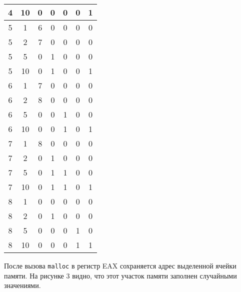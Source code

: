 \begin{table}[]
\begin{tabular}{|c|c|c|c|c|c|c|}
4     & 10     & 0         & 0        & 0        & 0          & 1        \\ \hline
5     & 1      & 6         & 0        & 0        & 0          & 0        \\ \hline
5     & 2      & 7         & 0        & 0        & 0          & 0        \\ \hline
5     & 5      & 0         & 1        & 0        & 0          & 0        \\ \hline
5     & 10     & 0         & 1        & 0        & 0          & 1        \\ \hline
6     & 1      & 7         & 0        & 0        & 0          & 0        \\ \hline
6     & 2      & 8         & 0        & 0        & 0          & 0        \\ \hline
6     & 5      & 0         & 0        & 1        & 0          & 0        \\ \hline
6     & 10     & 0         & 0        & 1        & 0          & 1        \\ \hline
7     & 1      & 8         & 0        & 0        & 0          & 0        \\ \hline
7     & 2      & 0         & 1        & 0        & 0          & 0        \\ \hline
7     & 5      & 0         & 1        & 1        & 0          & 0        \\ \hline
7     & 10     & 0         & 1        & 1        & 0          & 1        \\ \hline
8     & 1      & 0         & 0        & 0        & 0          & 0        \\ \hline
8     & 2      & 0         & 1        & 0        & 0          & 0        \\ \hline
8     & 5      & 0         & 0        & 0        & 1          & 0        \\ \hline
8     & 10     & 0         & 0        & 0        & 1          & 1        \\ \hline
\end{tabular}
\end{table}





После вызова \texttt{malloc} в регистр EAX сохраняется адрес выделенной ячейки памяти. На рисунке 3 видно, что этот участок памяти заполнен случайными значениями.
\FloatBarrier


